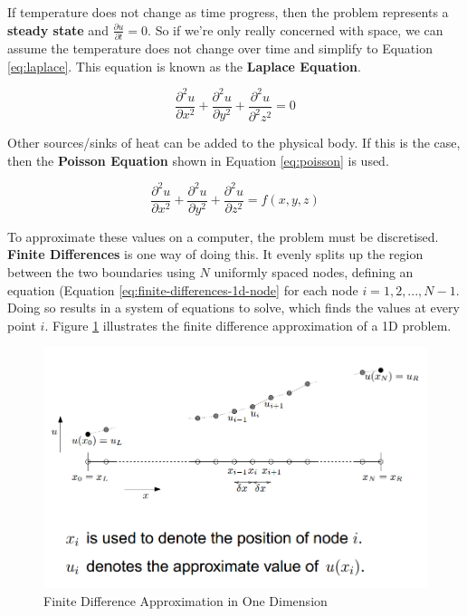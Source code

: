 \documentclass{article}
\begin{document}
If temperature does not change as time progress, then the problem represents a \textbf{steady state} and $\frac{\partial u}{\partial t} = 0$. So if we're only really concerned with space, we can assume the temperature does not change over time and simplify to Equation \ref{eq:laplace}. This equation is known as the \textbf{Laplace Equation}.

\begin{equation}
	\frac{\partial^2 u}{\partial x^2} + \frac{\partial^2 u}{\partial y^2} + \frac{\partial^2 u}{\partial^2 z^2} = 0
	\label{eq:laplace}
\end{equation}

Other sources/sinks of heat can be added to the physical body. If this is the case, then the \textbf{Poisson Equation} shown in Equation \ref{eq:poisson} is used. 

\begin{equation}
	\frac{\partial^2 u}{\partial x^2} + \frac{\partial^2 u}{\partial y^2} + \frac{\partial^2 u}{\partial z^2} = f(x, y, z)
	\label{eq:poisson}
\end{equation}

To approximate these values on a computer, the problem must be discretised. \textbf{Finite Differences} is one way of doing this. It evenly splits up the region between the two boundaries using $N$ uniformly spaced nodes, defining an equation (Equation \ref{eq:finite-differences-1d-node} for each node $i = 1, 2, ..., N - 1$. Doing so results in a system of equations to solve, which finds the values at every point $i$. Figure \ref{fig:finite-differences} illustrates the finite difference approximation of a 1D problem.

\begin{figure}
	\centering
	\includegraphics[scale=0.35]{figures/1d-finite-differences.png}
	\caption{Finite Difference Approximation in One Dimension}
	\label{fig:finite-differences}
\end{figure}
\end{document}
